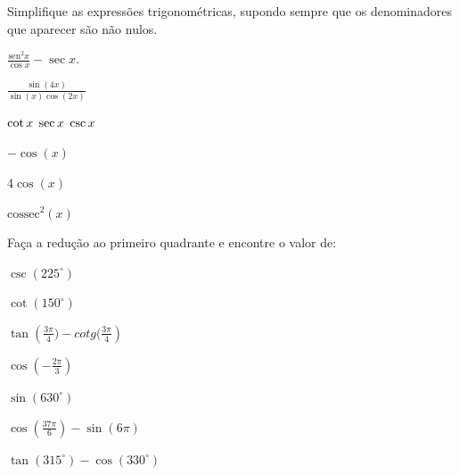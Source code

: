 \begin{exercises*}
\begin{exercise}
  Simplifique as expressões trigonométricas, supondo sempre que os
  denominadores que aparecer são não nulos.
  \begin{alphalist}
    \item $\frac{\text{sen}^2x}{\cos x}-\sec x$.
    \item $\frac{\sin(4x)}{\sin(x)\cos(2x)}$
    \item $\cot x \hspace{0,1cm} \sec x \hspace{0,1cm} \csc x $
  \end{alphalist}

  \begin{answer}
     \begin{alphalist}
       \item $-\cos(x)$
       \item $4\cos(x)$
       \item $\text{cossec}^2(x)$
     \end{alphalist}
  \end{answer}
\end{exercise}

\begin{exercise}
  Faça a redução ao  primeiro quadrante e encontre o valor de:
  \begin{alphalist}
    \item $\csc(225^{\circ})$
    \item $\cot(150^{\circ})$
    \item $\tan\left(\frac{3\pi}{4})- cotg(\frac{3\pi}{4}\right)$
    \item $\cos\left(-\frac{2\pi}{3}\right)$
    \item $\sin(630^{\circ})$
    \item $\cos\left( \frac{37\pi}{6}\right)- \sin(6\pi)$
    \item $\tan(315^{\circ})-\cos(330^{\circ})$
  \end{alphalist}


\end{exercise}
\end{exercises*}
